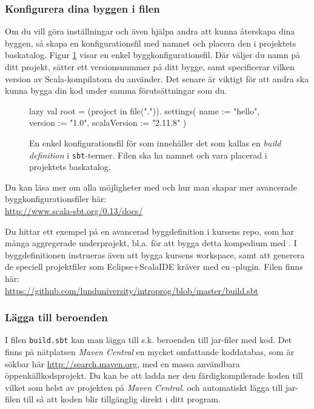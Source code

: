 \subsubsection{Konfigurera dina byggen i filen }

Om du vill göra inställningar och även hjälpa andra att kunna återskapa dina byggen, så skapa en konfigurationsfil med namnet  och placera den i projektets baskatalog. Figur \ref{fig:sbt:build-file} visar en enkel byggkonfigurationsfil. Där väljer du namn på ditt projekt, sätter ett versionsnummer på ditt bygge, samt specificerar vilken version av Scala-kompilatorn du använder. Det senare är viktigt för att andra ska kunna bygga din kod under samma förutsättningar som du. 

\begin{figure}[H]
\centering
\begin{Code}
lazy val root = (project in file(".")).
  settings(
    name := "hello",
    version := "1.0",
    scalaVersion := "2.11.8"
  )
\end{Code}
\caption{En enkel konfigurationsfil för \sbt som innehåller det som kallas en \textit{build definition} i \texttt{sbt}-termer. Filen ska ha namnet  och vara placerad i projektets baskatalog.}
\label{fig:sbt:build-file}
\end{figure}

\noindent Du kan läsa mer om alla möjligheter med \sbt och hur man skapar mer avancerade byggkonfigurationsfiler här: \\
\url{http://www.scala-sbt.org/0.13/docs/}

Du hittar ett exempel på en avancerad byggdefinition i kursens repo, som har många aggregerade underprojekt, bl.a. för att bygga detta kompedium med . I byggdefinitionen instrueras även \sbt att bygga kursens workspace, samt att generera de speciell projektfiler som Eclipse+ScalaIDE kräver med en \sbt-plugin. Filen finns här: \\
\url{https://github.com/lunduniversity/introprog/blob/master/build.sbt}

\subsubsection{Lägga till beroenden}

I filen \texttt{build.sbt} kan man lägga till s.k. beroenden till jar-filer med kod. Det finns på nätplatsen \textit{Maven Central} en mycket omfattande koddatabas, som är sökbar här \url{http://search.maven.org}, med en massa användbara öppenkällkodsprojekt. Du kan be \sbt att ladda ner den färdigkompilerade koden till vilket som helst av projekten på \textit{Maven Central}. och automatiskt lägga till jar-filen till  så att koden blir tillgänglig direkt i ditt program.

